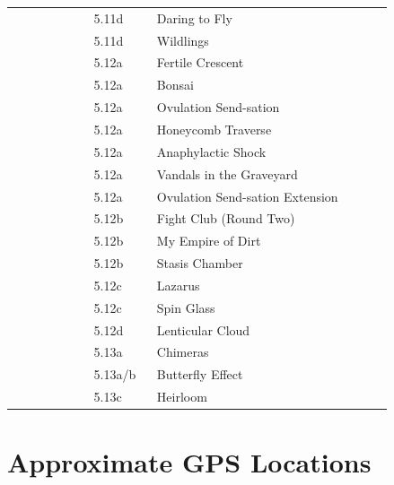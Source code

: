 \begin{flushleft}
\begin{center}
\begin{supertabular}{p{0.18\linewidth}p{0.13\linewidth}p{0.45\linewidth}p{0.08\linewidth}}
&5.11d&Daring to Fly & \pageref{rt:Daring to Fly} \\
&5.11d&Wildlings & \pageref{rt:Wildlings} \\
&5.12a&Fertile Crescent & \pageref{rt:Fertile Crescent} \\
&5.12a&Bonsai & \pageref{rt:Bonsai} \\
&5.12a&Ovulation Send-sation & \pageref{rt:Ovulation Send-sation} \\
&5.12a&Honeycomb Traverse & \pageref{vr:Honeycomb Traverse} \\
&5.12a&Anaphylactic Shock & \pageref{rt:Anaphylactic Shock} \\
&5.12a&Vandals in the Graveyard & \pageref{rt:Vandals in the Graveyard} \\
&5.12a&Ovulation Send-sation Extension & \pageref{vr:Ovulation Send-sation Extension} \\
&5.12b&Fight Club (Round Two) & \pageref{rt:Fight Club (Round Two)} \\
&5.12b&My Empire of Dirt & \pageref{rt:My Empire of Dirt} \\
&5.12b&Stasis Chamber & \pageref{rt:Stasis Chamber} \\
&5.12c&Lazarus & \pageref{vr:Lazarus} \\
&5.12c&Spin Glass & \pageref{rt:Spin Glass} \\
&5.12d&Lenticular Cloud & \pageref{rt:Lenticular Cloud} \\
&5.13a&Chimeras & \pageref{rt:Chimeras} \\
&5.13a/b&Butterfly Effect & \pageref{rt:Butterfly Effect} \\
&5.13c&Heirloom & \pageref{rt:Heirloom} \\
\end{supertabular}
\end{center}
\needspace{1.5cm}
\section{Approximate GPS Locations}

\end{flushleft}
